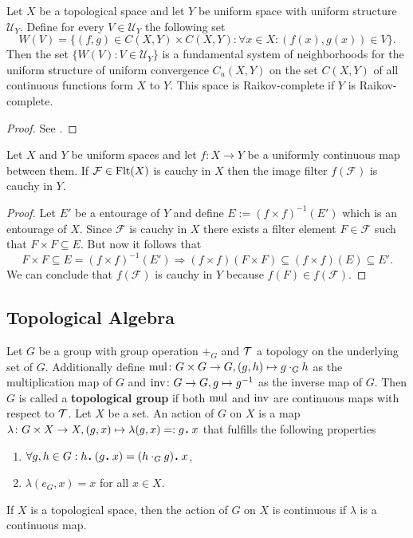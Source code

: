 \begin{ex}\label{ex:cxycomp}
  Let $X$ be a topological space and let $Y$ be uniform space with uniform structure $\mathcal{U}_Y$. Define for every $V \in \mathcal{U}_Y$ the following set $$ W(V) = \{(f,g) \in C(X,Y)\times C(X,Y)\colon \forall x\in X\colon (f(x),g(x)) \in V\}.$$ Then the set $\{W(V)\colon V\in \mathcal{U}_Y\}$ is a fundamental system of neighborhoods for the uniform structure of uniform convergence $C_u(X,Y)$ on the set $C(X, Y)$ of all continuous functions form $X$ to $Y$. This space is Raikov-complete if $Y$ is Raikov-complete. 
\end{ex}

\begin{proof}
  See \cite[p.183ff.]{BvQMT}.
\end{proof}

\begin{lemma}
  Let $X$ and $Y$ be uniform spaces and let $f\colon X \to Y$ be a uniformly continuous map between them. If $\mathcal{F} \in {\rm Flt}(X)$ is cauchy in $X$ then the image filter $f(\mathcal{F})$ is cauchy in $Y$.
\end{lemma}

\begin{proof}
  Let $E'$ be a entourage of $Y$ and define $E := (f\times f)^{-1}(E')$ which is an entourage of $X$. Since $\mathcal{F}$ is cauchy in $X$ there exists a filter element $F \in \mathcal{F}$ such that $F \times F \subseteq E$. But now it follows that $$ F \times F \subseteq E = (f \times f)^{-1}(E') \Rightarrow (f\times f)(F\times F) \subseteq (f\times f)(E) \subseteq E'.$$ We can conclude that $f(\mathcal{F})$ is cauchy in $Y$ because $f(F) \in f(\mathcal{F})$.
\end{proof}

\subsection{Topological Algebra}

\begin{defin}
  Let $G$ be a group with group operation $+_G$ and $\mathcal{T}$ a topology on the underlying set of $G$. Additionally define ${\rm mul}\colon G \times G \to G, (g, h) \mapsto g \cdot_G h$ as the multiplication map of $G$ and ${\rm inv}\colon G \to G, g \mapsto g^{-1}$ as the inverse map of $G$. Then $G$ is called a \textbf{topological group} if both ${\rm mul}$ and ${\rm inv}$ are continuous maps with respect to $\mathcal{T}$.
  Let $X$ be a set. An action of $G$ on $X$ is a map $\lambda\colon G\times X \to X, (g, x) \mapsto \lambda(g, x) =: g \anddot x$ that fulfills the following properties
  \begin{enumerate}
    \item $\forall g, h \in G: h \anddot (g \anddot x) = (h \cdot_G g) \anddot x$,
    \item $\lambda(e_G, x) = x$ for all $x \in X$.
  \end{enumerate}
  If $X$ is a topological space, then the action of $G$ on $X$ is continuous if $\lambda$ is a continuous map.
\end{defin}

